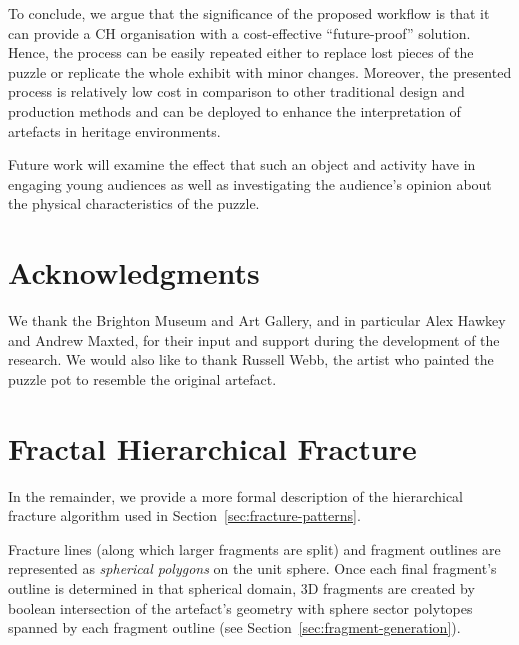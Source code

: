 \documentclass[acmlarge,screen,dvipsnames]{acmart}
\begin{document}
\greenEnd



To conclude, we argue that the significance of the proposed workflow
is that it can provide a CH organisation with a cost-effective
``future-proof'' solution. Hence, the process can be easily repeated
either to replace lost pieces of the puzzle or replicate the whole
exhibit with minor changes. Moreover, the presented process is
relatively low cost in comparison to other traditional design and
production methods and can be deployed to enhance the interpretation
of artefacts in heritage environments.

Future work will examine the effect that such an object and activity
have in engaging young audiences as well as investigating the
audience's opinion about the physical characteristics of the puzzle.

\section{Acknowledgments}

We thank the Brighton Museum and Art Gallery, and in particular Alex
Hawkey and Andrew Maxted, for their input and support during the
development of the research. We would also like to thank Russell Webb,
the artist who painted the puzzle pot to resemble the original
artefact.

\appendix

\newcommand{\IR}{\RR}

\section{Fractal Hierarchical Fracture}
\label{apx:hierarchical-algo}

In the remainder, we provide a more formal description of the
hierarchical fracture algorithm used in
Section~\ref{sec:fracture-patterns}.

Fracture lines (along which larger fragments are split) and fragment
outlines are represented as \emph{spherical polygons} on the unit
sphere. Once each final fragment's outline is determined in that
spherical domain, 3D fragments are created by boolean intersection of
the artefact's geometry with sphere sector polytopes spanned by each
fragment outline (see Section~\ref{sec:fragment-generation}).
\end{document}
